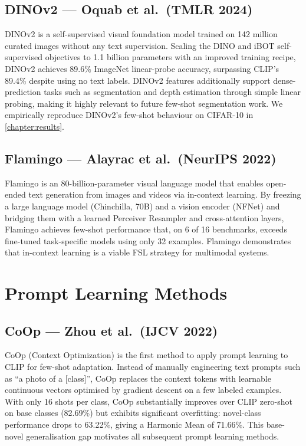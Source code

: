 \documentclass{iutbscthesis}
\begin{document}
\subsection{DINOv2 --- Oquab et al.\ (TMLR 2024)}
DINOv2 \cite{oquab2024dinov2} is a self-supervised visual foundation model trained on 142 million curated images without any text supervision. Scaling the DINO and iBOT self-supervised objectives to 1.1 billion parameters with an improved training recipe, DINOv2 achieves 89.6\% ImageNet linear-probe accuracy, surpassing CLIP's 89.4\% despite using no text labels. DINOv2 features additionally support dense-prediction tasks such as segmentation and depth estimation through simple linear probing, making it highly relevant to future few-shot segmentation work. We empirically reproduce DINOv2's few-shot behaviour on CIFAR-10 in \autoref{chapter:results}.

\subsection{Flamingo --- Alayrac et al.\ (NeurIPS 2022)}
Flamingo \cite{alayrac2022flamingo} is an 80-billion-parameter visual language model that enables open-ended text generation from images and videos via in-context learning. By freezing a large language model (Chinchilla, 70B) and a vision encoder (NFNet) and bridging them with a learned Perceiver Resampler and cross-attention layers, Flamingo achieves few-shot performance that, on 6 of 16 benchmarks, exceeds fine-tuned task-specific models using only 32 examples. Flamingo demonstrates that in-context learning is a viable FSL strategy for multimodal systems.

\section{Prompt Learning Methods}

\subsection{CoOp --- Zhou et al.\ (IJCV 2022)}
CoOp (Context Optimization) \cite{zhou2022coop} is the first method to apply prompt learning to CLIP for few-shot adaptation. Instead of manually engineering text prompts such as ``a photo of a [class]'', CoOp replaces the context tokens with learnable continuous vectors optimised by gradient descent on a few labeled examples. With only 16 shots per class, CoOp substantially improves over CLIP zero-shot on base classes (82.69\%) but exhibits significant overfitting: novel-class performance drops to 63.22\%, giving a Harmonic Mean of 71.66\%. This base-novel generalisation gap motivates all subsequent prompt learning methods.
\end{document}
